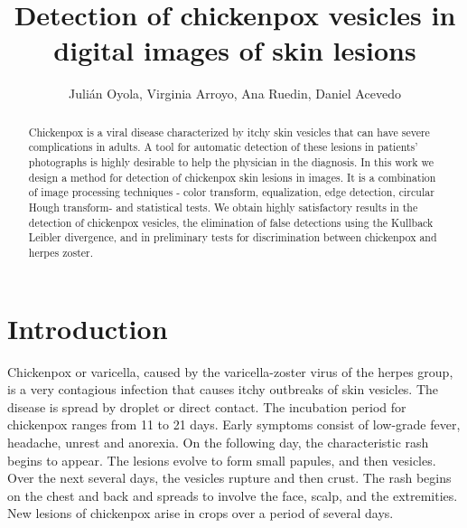 \documentclass[oribibl]{llncs}
\begin{document}
\title{Detection of chickenpox vesicles in digital images of skin lesions} %
\author{Juli\'an Oyola, Virginia Arroyo, Ana Ruedin, Daniel Acevedo}
\maketitle
\begin{abstract} %
Chickenpox is a viral disease characterized by itchy skin vesicles that can have severe complications in adults. A tool for automatic detection of these lesions in patients' photographs is highly desirable to help the physician in the diagnosis.
In this work we design a method for detection of chickenpox skin lesions in images. 
It is a combination of image processing techniques - color transform, equalization, edge detection, circular Hough transform-  and statistical tests. %
We obtain highly satisfactory results in the detection of chickenpox vesicles, the elimination of false detections using the Kullback Leibler divergence, and in preliminary tests for discrimination between chickenpox and herpes zoster. 
\end{abstract}

\thispagestyle{empty}


\section{Introduction}
Chickenpox or varicella, caused by the varicella-zoster virus of the herpes group, is a very contagious infection that causes itchy outbreaks of skin vesicles.  The disease is spread by droplet or direct contact. The incubation period for chickenpox ranges from 11 to 21 days. Early symptoms consist of low-grade fever, headache, unrest and anorexia. 
On the following day, the characteristic rash begins to appear. The lesions evolve to form small papules, and then vesicles. 
Over the next several days, the vesicles rupture and then crust. The rash begins on the chest and back and spreads  to involve the face, scalp, and the extremities. 
New lesions of chickenpox arise in crops over a period of several days. 
\end{document}
